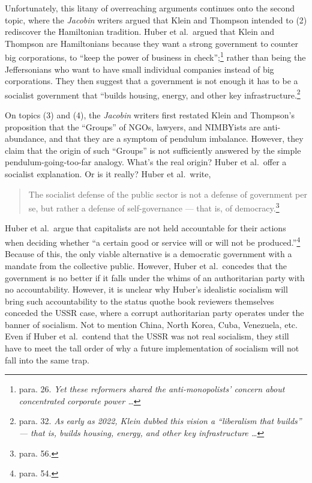 \documentclass[12pt]{article}
\begin{document}
Unfortunately, this litany of overreaching arguments continues onto the second topic, where the \textit{Jacobin} writers argued that Klein and Thompson intended to (2) rediscover the Hamiltonian tradition. Huber et al.\ argued that Klein and Thompson are Hamiltonians because they want a strong government to counter big corporations, to ``keep the power of business in check'';\footnote{para. 26. \textit{Yet these reformers shared the anti-monopolists’ concern about concentrated corporate power \dots}} rather than being the Jeffersonians who want to have small individual companies instead of big corporations. They then suggest that a government is not enough\textemdash{} it has to be a socialist government that ``builds housing, energy, and other key infrastructure.\footnote{para. 32. \textit{As early as 2022, Klein dubbed this vision a “liberalism that builds” — that is, builds housing, energy, and other key infrastructure \dots}}

On topics (3) and (4), the \textit{Jacobin} writers first restated Klein and Thompson's proposition that the ``Groups'' of NGOs, lawyers, and NIMBYists are anti-abundance, and that they are a symptom of pendulum imbalance. However, they claim that the origin of such ``Groups'' is not sufficiently answered by the simple pendulum-going-too-far analogy. What's the real origin? Huber et al.\ offer a socialist explanation. Or is it really? Huber et al.\ write,

\begin{quotation}
	The socialist defense of the public sector is not a defense of government per se, but rather a defense of self-governance — that is, of democracy.\footnote{para. 56.}
\end{quotation}

Huber et al.\ argue that capitalists are not held accountable for their actions when deciding whether ``a certain good or service will or will not be produced.''\footnote{para. 54.} Because of this, the only viable alternative is a democratic government with a mandate from the collective public. However, Huber et al.\ concedes that the government is no better if it falls under the whims of an authoritarian party with no accountability. However, it is unclear why Huber's idealistic socialism will bring such accountability to the status quo\textemdash{}the book reviewers themselves conceded the USSR case, where a corrupt authoritarian party operates under the banner of socialism. Not to mention China, North Korea, Cuba, Venezuela, etc. Even if Huber et al.\ contend that the USSR was not real socialism, they still have to meet the tall order of why a future implementation of socialism will not fall into the same trap.
\end{document}
